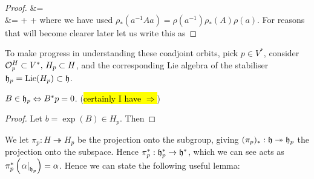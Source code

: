 \documentclass{article}
\begin{document}
\begin{proof}
{&=  \\
&=  +  + 
}
where we have used $\rho_\ast(a^{-1}Aa)= \rho(a^{-1})\rho_\ast(A) \rho(a)$. For reasons that will become clearer later let us write this as 

\end{proof}
To make progress in understanding these coadjoint orbits, pick $p \in V^\ast$, consider $\mathcal{O}_p^H \subset V^\ast, \, H_p \subset H$, and the corresponding Lie algebra of the stabiliser $\mathfrak{h}_p = \operatorname{Lie}(H_p) \subset \mathfrak{h}$. 

\begin{lemma}
$B \in \mathfrak{h}_p  \Leftrightarrow B^\ast p = 0$. (\hl{certainly I have $\Rightarrow$})
\end{lemma}
\begin{proof}
Let $b = \exp(B) \in H_p$. Then 
\end{proof}

We let $\pi_p : H \twoheadrightarrow H_p$ be the projection onto the subgroup, giving $(\pi_p)_\ast: \mathfrak{h} \twoheadrightarrow \mathfrak{h}_p $ the projection onto the subspace. Hence $\pi_p^\ast : \mathfrak{h}_p^\ast \to \mathfrak{h}^\ast$, which we can see acts as $\pi_p^\ast \left( \left. \alpha \right\rvert_{\mathfrak{h}_p} \right) = \alpha$. Hence we can state the following useful lemma:
\end{document}
